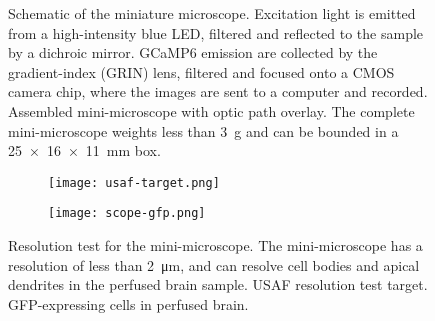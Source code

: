\begin{figure}[h]
    \begin{subfigure}[t]{.3333\textwidth}
        \centering
        
        \caption{\label{f.scope-schema}}
    \end{subfigure}
    \begin{subfigure}[t]{.6666\textwidth}
        \centering
        
        \caption{\label{f.scope}}
    \end{subfigure}
    \caption[Schematic of the miniature microscope.]{ Schematic of the miniature microscope. Excitation light is emitted from a high-intensity blue LED, filtered and reflected to the sample by a dichroic mirror. GCaMP6 emission are collected by the gradient-index (GRIN) lens, filtered and focused onto a CMOS camera chip, where the images are sent to a computer and recorded. 
     Assembled mini-microscope with optic path overlay. The complete mini-microscope weights less than \SI{3}{\gram} and can be bounded in a \SI{25 x 16 x 11}{\mm} box.}
\end{figure}

\begin{figure}[h]
    \begin{subfigure}[t]{.57\textwidth}
        \centering
        \texttt{[image: usaf-target.png]}
        \caption{\label{f.usaf}}
    \end{subfigure}
    \begin{subfigure}[t]{.43\textwidth}
        \centering
        \texttt{[image: scope-gfp.png]}
        \caption{\label{f.scope-gfp}}
    \end{subfigure}
    \caption[Resolution of the mini-microscope.]{Resolution test for the mini-microscope. The mini-microscope has a resolution of less than \SI{2}{\um}, and can resolve cell bodies and apical dendrites in the perfused brain sample. 
         USAF resolution test target.
         GFP-expressing cells in perfused brain.}
\end{figure}


